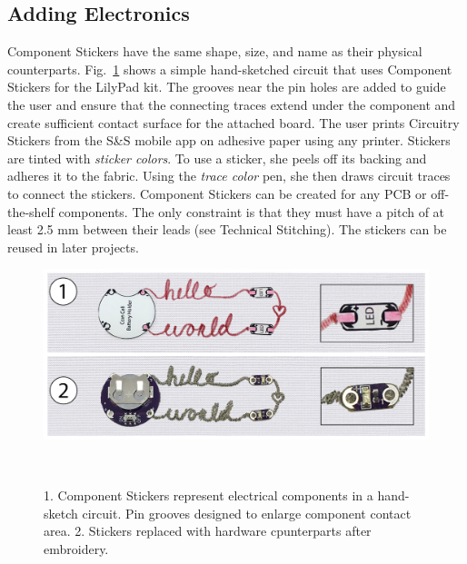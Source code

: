 \documentclass[header.tex]{subfiles}
\begin{document}
\subsection{Adding Electronics}

Component Stickers have the same shape, size, and name as their physical counterparts. Fig.\ \ref{fig:ComponentStickers} shows a simple hand-sketched circuit that uses Component Stickers for the LilyPad kit. 
The grooves near the pin holes are added to guide the user and ensure that the connecting traces extend under the component and create sufficient contact surface for the attached board. 
The user prints Circuitry Stickers from the S\&S mobile app on adhesive paper using any printer. Stickers are tinted with \textit{sticker colors}. To use a sticker, she peels off its backing and adheres it to the fabric. %
Using the \textit{trace color} pen, she then draws circuit traces to connect the stickers. 
Component Stickers can be created for any PCB or off-the-shelf components. The only constraint is that they must have a pitch of at least 2.5 mm between their leads (see Technical Stitching). The stickers can be reused in later projects.


\begin{figure}[t]
\centering
  \includegraphics[width=0.85\columnwidth]{figures/ComponentStickers.png}
  \caption{1. Component Stickers represent electrical components in a hand-sketch circuit. Pin grooves designed to enlarge component contact area. 2. Stickers replaced with hardware cpunterparts after embroidery.}~\label{fig:ComponentStickers}
  \vspace{-2.2em}
\end{figure}
\end{document}
